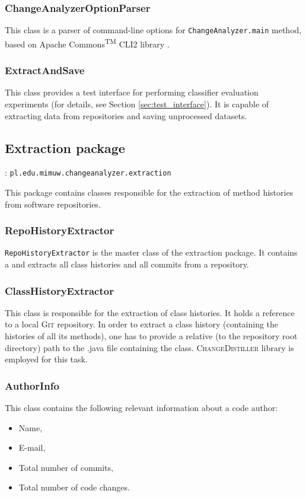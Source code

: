 \documentclass{pracamgr}
\newcommand{\pack}[3]{\subsection{#1 package} \label{sec:#2} \underline{\smash{Full package name}}: \texttt{#3}\medskip}
\begin{document}
\subsubsection*{ChangeAnalyzerOptionParser}
This class is a parser of command-line options for \texttt{ChangeAnalyzer.main} method, based on Apache Commons\textsuperscript{TM} CLI2 library \cite{cli2}.

\subsubsection*{ExtractAndSave}
This class provides a test interface for performing classifier evaluation experiments (for details, see Section \ref{sec:test_interface}). It is capable of extracting data from repositories and saving unprocessed datasets.

\pack{Extraction}{extraction}{pl.edu.mimuw.changeanalyzer.extraction}

\noindent This package contains classes responsible for the extraction of method histories from software repositories.

\subsubsection*{RepoHistoryExtractor}
\texttt{RepoHistoryExtractor} is the master class of the extraction package. It contains a  and extracts all class histories and all commits from a repository.

\subsubsection*{ClassHistoryExtractor}
This class is responsible for the extraction of class histories. It holds a reference to a local \textsc{Git} repository. In order to extract a class history (containing the histories of all its methods), one has to provide a relative (to the repository root directory) path to the .java file containing the class. \textsc{ChangeDistiller} library is employed for this task.

\subsubsection*{AuthorInfo}
This class contains the following relevant information about a code author:
\begin{itemize}[noitemsep,topsep=1pt]
	\item Name,
	\item E-mail,
	\item Total number of commits,
	\item Total number of code changes.
\end{itemize}
\end{document}
